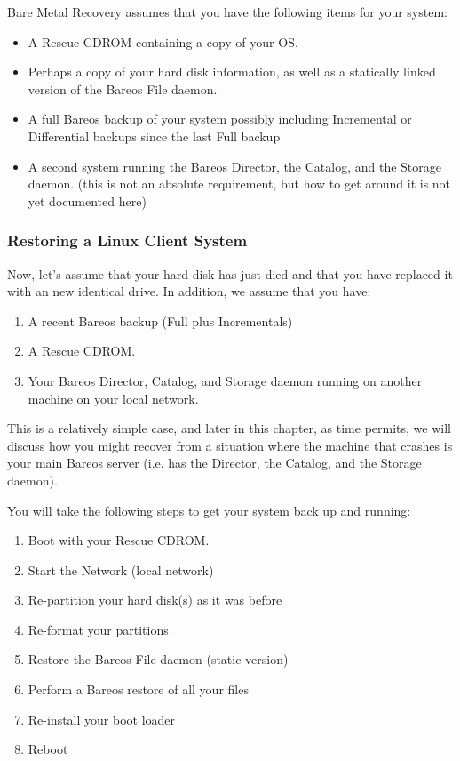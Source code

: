 Bare Metal Recovery assumes that you have the following items for your system:

\begin{itemize}
\item A Rescue CDROM containing a copy of your OS.
\item Perhaps a copy of your
   hard disk information, as well as a statically linked version of the
   Bareos File daemon.
\item A full Bareos backup of your system possibly including  Incremental or
   Differential backups since the last Full  backup
\item A second system running the Bareos Director, the Catalog, and the
   Storage daemon.  (this is not an absolute requirement, but how to get
   around it is not yet documented here)
\end{itemize}

\subsubsection{Restoring a Linux Client System}
\label{restore_client}

Now, let's assume that your hard disk has just died and that you have replaced
it with an new identical drive. In addition, we assume that you have:

\begin{enumerate}
\item A recent Bareos backup (Full plus Incrementals)
\item A Rescue CDROM.
\item Your Bareos Director, Catalog, and Storage daemon running  on another
   machine on your local network.
\end{enumerate}

This is a relatively simple case, and later in this chapter, as time permits,
we will discuss how you might recover from a situation where the machine that
crashes is your main Bareos server (i.e. has the Director, the Catalog, and
the Storage daemon).

You will take the following steps to get your system back up and running:

\begin{enumerate}
\item Boot with your Rescue CDROM.
\item Start the Network (local network)
\item Re-partition your hard disk(s) as it was before
\item Re-format your partitions
\item Restore the Bareos File daemon (static version)
\item Perform a Bareos restore of all your files
\item Re-install your boot loader
\item Reboot
\end{enumerate}

